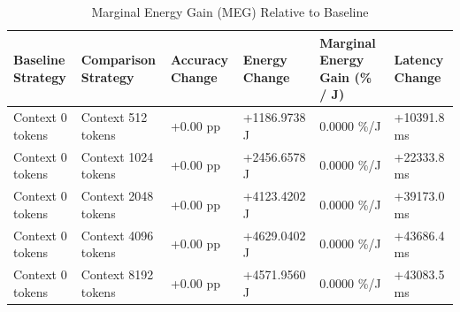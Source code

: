 \begin{table}
\caption{Marginal Energy Gain (MEG) Relative to Baseline}
\label{tab:marginal_energy_gain}
\begin{tabular}{llllll}
\toprule
Baseline Strategy & Comparison Strategy & Accuracy Change & Energy Change & Marginal Energy Gain (\% / J) & Latency Change \\
\midrule
Context 0 tokens & Context 512 tokens & +0.00 pp & +1186.9738 J & 0.0000 \%/J & +10391.8 ms \\
Context 0 tokens & Context 1024 tokens & +0.00 pp & +2456.6578 J & 0.0000 \%/J & +22333.8 ms \\
Context 0 tokens & Context 2048 tokens & +0.00 pp & +4123.4202 J & 0.0000 \%/J & +39173.0 ms \\
Context 0 tokens & Context 4096 tokens & +0.00 pp & +4629.0402 J & 0.0000 \%/J & +43686.4 ms \\
Context 0 tokens & Context 8192 tokens & +0.00 pp & +4571.9560 J & 0.0000 \%/J & +43083.5 ms \\
\bottomrule
\end{tabular}
\end{table}

